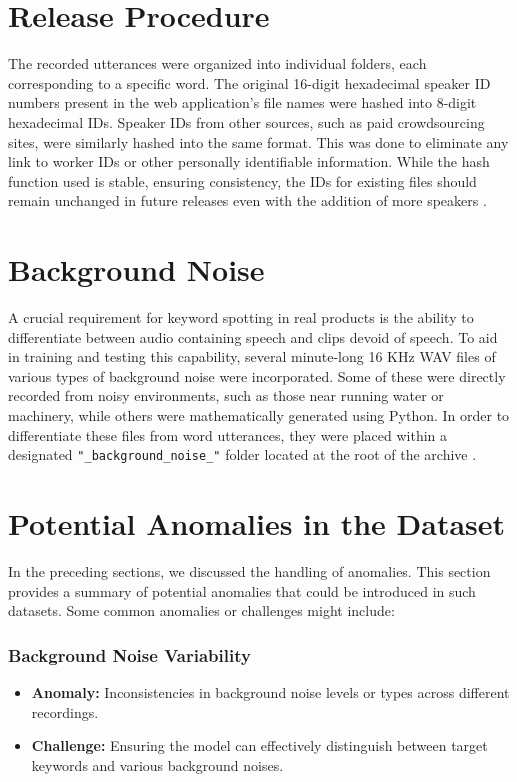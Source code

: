 \section{Release Procedure}

The recorded utterances were organized into individual folders, each corresponding to a specific word. The original 16-digit hexadecimal speaker ID numbers present in the web application's file names were hashed into 8-digit hexadecimal IDs. Speaker IDs from other sources, such as paid crowdsourcing sites, were similarly hashed into the same format. This was done to eliminate any link to worker IDs or other personally identifiable information. While the hash function used is stable, ensuring consistency, the IDs for existing files should remain unchanged in future releases even with the addition of more speakers \cite{Warden:2018}.

\section{Background Noise}

A crucial requirement for keyword spotting in real products is the ability to differentiate between audio containing speech and clips devoid of speech. To aid in training and testing this capability, several minute-long 16 KHz WAV files of various types of background noise were incorporated. Some of these were directly recorded from noisy environments, such as those near running water or machinery, while others were mathematically generated using Python. In order to differentiate these files from word utterances, they were placed within a designated \texttt{"\_background\_noise\_"} folder located at the root of the archive \cite{Warden:2018}.

\section{Potential Anomalies in the Dataset}

In the preceding sections, we discussed the handling of anomalies. This section provides a summary of potential anomalies that could be introduced in such datasets. Some common anomalies or challenges might include:

\subsubsection{Background Noise Variability}

\begin{itemize}
	\item \textbf{Anomaly:} Inconsistencies in background noise levels or types across different recordings.
	\item \textbf{Challenge:} Ensuring the model can effectively distinguish between target keywords and various background noises.
\end{itemize}

